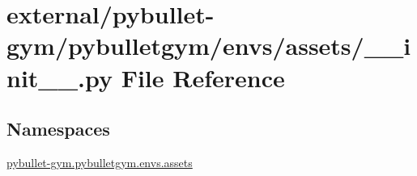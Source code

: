 \hypertarget{external_2pybullet-gym_2pybulletgym_2envs_2assets_2____init_____8py}{}\section{external/pybullet-\/gym/pybulletgym/envs/assets/\+\_\+\+\_\+init\+\_\+\+\_\+.py File Reference}
\label{external_2pybullet-gym_2pybulletgym_2envs_2assets_2____init_____8py}
\subsection*{Namespaces}
\begin{DoxyCompactItemize}
\item 
 \hyperlink{namespacepybullet-gym_1_1pybulletgym_1_1envs_1_1assets}{pybullet-\/gym.\+pybulletgym.\+envs.\+assets}
\end{DoxyCompactItemize}
